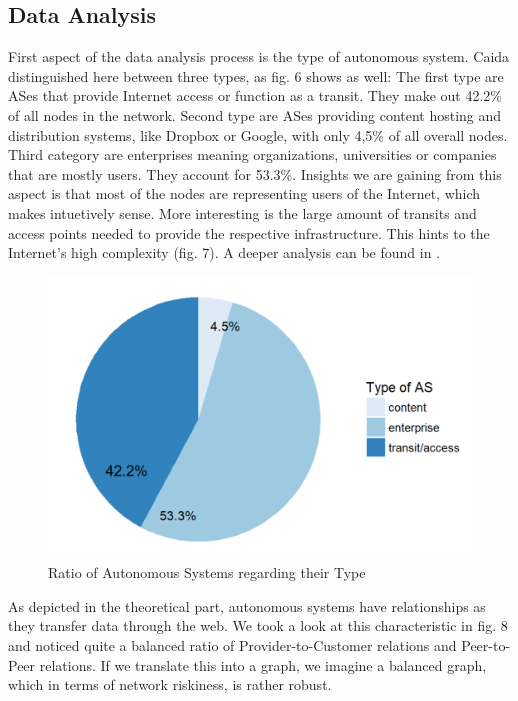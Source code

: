 \documentclass[conference, 11pt]{IEEEtran}
\begin{document}
\subsection{Data Analysis}
First aspect of the data analysis process is the type of autonomous system. Caida distinguished here between three types, as fig. 6 shows as well: The first type are ASes that provide Internet access or function as a transit. They make out 42.2\% of all nodes in the network. Second type are ASes providing content hosting and distribution systems, like Dropbox or Google, with only 4,5\% of all overall nodes. Third category are enterprises meaning organizations, universities or companies that are mostly users. They account for 53.3\%. Insights we are gaining from this aspect is that most of the nodes are representing users of the Internet, which makes intuetively sense. More interesting is the large amount of transits and access points needed to provide the respective infrastructure. This hints to the Internet's high complexity (fig. 7). A deeper analysis can be found in \cite{runningTheWeb}.

\vspace{0.5cm}
\begin{figure}[htbp]
\centerline{\includegraphics[scale=0.4]{Graphics/typeofAS.PNG}}
\caption{Ratio of Autonomous Systems regarding their Type }
\label{fig}
\end{figure}
\vspace{0.5cm}

As depicted in the theoretical part, autonomous systems have relationships as they transfer data through the web. We took a look at this characteristic in fig. 8 and noticed quite a balanced ratio of Provider-to-Customer relations and Peer-to-Peer relations. If we translate this into a graph, we imagine a balanced graph, which in terms of network riskiness, is rather robust. 
\end{document}
